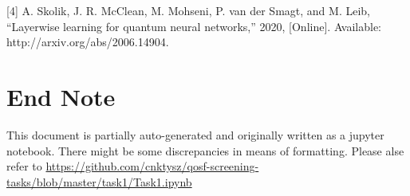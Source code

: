 \documentclass[11pt]{article}
\begin{document}
{[}4{]} A. Skolik, J. R. McClean, M. Mohseni, P. van der Smagt, and M.
Leib, ``Layerwise learning for quantum neural networks,'' 2020,
{[}Online{]}. Available: http://arxiv.org/abs/2006.14904.


\section*{End Note}

This document is partially auto-generated and originally written as a jupyter notebook. There might be some discrepancies in means of formatting. Please alse refer to \url{https://github.com/cnktysz/qosf-screening-tasks/blob/master/task1/Task1.ipynb}

    
\end{document}
